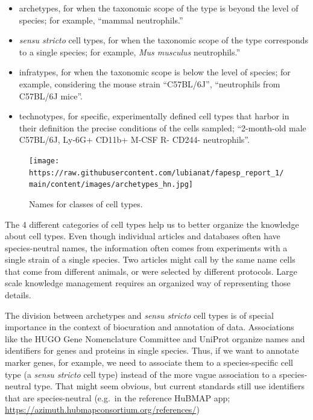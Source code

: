 \begin{itemize}
\tightlist
\item
  archetypes, for when the taxonomic scope of the type is beyond the level of species; for example, ``mammal neutrophils.''
\item
  \emph{sensu stricto} cell types, for when the taxonomic scope of the type corresponds to a single species; for example, \emph{Mus musculus} neutrophils.''
\item
  infratypes, for when the taxonomic scope is below the level of species; for example, considering the mouse strain ``C57BL/6J'', ``neutrophils from C57BL/6J mice''.
\item
  technotypes, for specific, experimentally defined cell types that harbor in their definition the precise conditions of the cells sampled; ``2-month-old male C57BL/6J, Ly-6G+ CD11b+ M-CSF R- CD244- neutrophils''.
\end{itemize}

\begin{figure}
\hypertarget{fig:classes}{%
\centering
\texttt{[image: https://raw.githubusercontent.com/lubianat/fapesp\_report\_1/main/content/images/archetypes\_hn.jpg]}
\caption{Names for classes of cell types.}\label{fig:classes}
}
\end{figure}

The 4 different categories of cell types help us to better organize the knowledge about cell types.
Even though individual articles and databases often have species-neutral names, the information often comes from experiments with a single strain of a single species.
Two articles might call by the same name cells that come from different animals, or were selected by different protocols.
Large scale knowledge management requires an organized way of representing those details.

The division between archetypes and \emph{sensu stricto} cell types is of special importance in the context of biocuration and annotation of data.
Associations like the HUGO Gene Nomenclature Committee and UniProt organize names and identifiers for genes and proteins in single species.
Thus, if we want to annotate marker genes, for example, we need to associate them to a species-specific cell type (a \emph{sensu stricto} cell type) instead of the more vague association to a species-neutral type.
That might seem obvious, but current standards still use identifiers that are species-neutral (e.g.~in the reference HuBMAP app; \url{https://azimuth.hubmapconsortium.org/references/})

